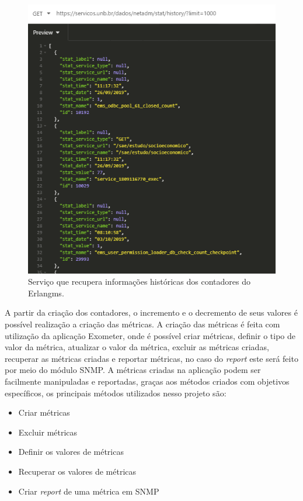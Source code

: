 {\begin{figure}[h!]
	\begin{center}
	\includegraphics[scale = 0.70]{img/webserviceStats.png}
	\caption{Serviço que recupera informações históricas dos contadores do Erlangms.}
	\label{fun:fig:webserviceStats}
	\end{center}
\end{figure}

A partir da criação dos contadores, o incremento e o decremento de seus valores é possível realização a criação das métricas. A criação das métricas é feita com utilização da aplicação Exometer, onde é possível criar métricas, definir o tipo de valor da métrica, atualizar o valor da métrica, excluir as métricas criadas, recuperar as métricas criadas e reportar métricas, no caso do \textit{report} este será feito por meio do módulo \acrshort{SNMP}. A métricas criadas na aplicação podem ser facilmente manipuladas e reportadas, graças aos métodos criados com objetivos específicos, os principais métodos utilizados nesso projeto são:
\begin{itemize}
    \item Criar métricas
    \item Excluir métricas
    \item Definir os valores de métricas
    \item Recuperar os valores de métricas
    \item Criar \textit{report} de uma métrica em SNMP
\end{itemize}

}
